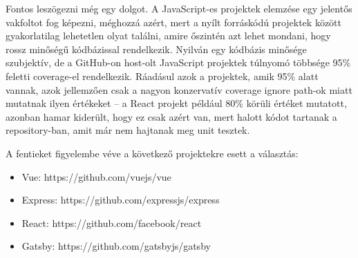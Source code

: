 Fontos leszögezni még egy dolgot. A JavaScript-es projektek elemzése egy jelentős vakfoltot fog képezni, méghozzá azért, mert a nyílt forráskódú projektek között gyakorlatilag lehetetlen olyat találni, amire őszintén azt lehet mondani, hogy rossz minőségű kódbázissal rendelkezik. Nyilván egy kódbázis minősége szubjektív, de a GitHub-on host-olt JavaScript projektek túlnyomó többsége 95\% feletti coverage-el rendelkezik. Ráadásul azok a projektek, amik 95\% alatt vannak, azok jellemzően csak a nagyon konzervatív coverage ignore path-ok miatt mutatnak ilyen értékeket -- a React projekt például 80\% körüli értéket mutatott, azonban hamar kiderült, hogy ez csak azért van, mert halott kódot tartanak a repository-ban, amit már nem hajtanak meg unit tesztek.

A fentieket figyelembe véve a következő projektekre esett a választás:
\begin{itemize}
    \item Vue: https://github.com/vuejs/vue
    \item Express: https://github.com/expressjs/express
    \item React: https://github.com/facebook/react
    \item Gatsby: https://github.com/gatsbyjs/gatsby
\end{itemize}

\pagebreak


\pagebreak


\pagebreak
